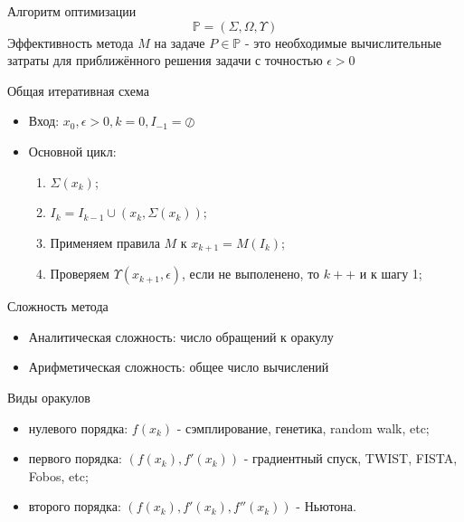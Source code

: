 \documentclass[14pt, fleqn, xcolor={dvipsnames, table}]{beamer}
\begin{document}
\begin{frame}{Алгоритм оптимизации}
  $$
  \mathbb{P} = (\Sigma, \Omega, \Upsilon)
  $$
  Эффективность метода $M$ на задаче $P \in \mathbb{P}$ - это необходимые вычислительные затраты для приближённого решения задачи с точностью $\epsilon > 0$
\end{frame}

\begin{frame}{Общая итеративная схема}
\begin{itemize}
   \item Вход: $x_0, \epsilon > 0, k = 0, I_{-1} = \oslash$ 
   \item Основной цикл:
    \begin{enumerate}
      \item $\Sigma(x_k)$;
      \item $I_k = I_{k-1} \cup (x_k, \Sigma(x_k))$;
      \item Применяем правила $M$ к $x_{k+1} = M(I_k)$;
      \item Проверяем $\Upsilon(x_{k+1}, \epsilon)$, если не выполенено, то $k++$ и к шагу 1;
    \end{enumerate}
\end{itemize}
\end{frame}

\begin{frame}{Сложность метода}
\begin{itemize}
   \item Аналитическая сложность: число обращений к оракулу
   \item Арифметическая сложность: общее число вычислений
\end{itemize}
\end{frame}


\begin{frame}{Виды оракулов}
\begin{itemize}
   \item нулевого порядка: $f(x_k)$ - сэмплирование, генетика, random walk, etc;
   \item первого порядка: $(f(x_k), f'(x_k))$ - градиентный спуск, TWIST, FISTA, Fobos, etc;
   \item второго порядка: $(f(x_k), f'(x_k), f''(x_k))$ - Ньютона.
\end{itemize}
\end{frame}
\end{document}
